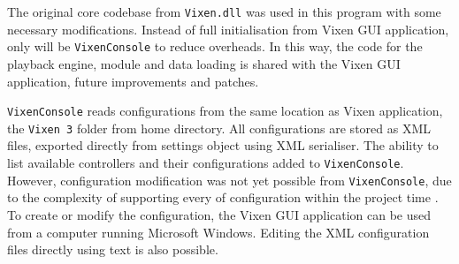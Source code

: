 

The original core codebase from \texttt{Vixen.dll} was used in this program with some necessary modifications. Instead of full initialisation from Vixen GUI application, only  will be  \texttt{VixenConsole} to reduce overheads. In this way, the code for the playback engine, module and data loading is  shared with the Vixen GUI application,  future improvements and patches.

\texttt{VixenConsole} reads configurations from the same location as  Vixen application, the \texttt{Vixen 3} folder from  home directory. All configurations are stored as XML files, exported directly from  settings object using  XML serialiser. The ability to list available controllers and their configurations  added to \texttt{VixenConsole}. However, configuration modification was not yet possible from \texttt{VixenConsole}, due to the complexity of supporting every   of configuration  within the project time . To create or modify the configuration, the Vixen GUI application can be used from a computer running Microsoft Windows. Editing the XML configuration files directly using  text  is also possible.



